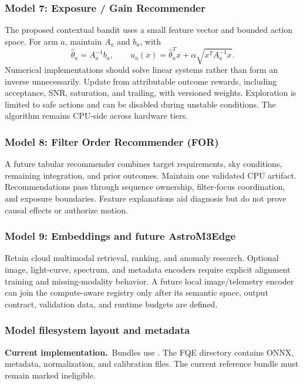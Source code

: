 \documentclass[11pt,a4paper]{article}
\newcommand{\code}[1]{\texttt{\detokenize{#1}}}
\newcommand{\current}{\textbf{Current implementation.}\ }
\begin{document}
\subsubsection{Model 7: Exposure / Gain Recommender}
The proposed contextual bandit uses a small feature vector and bounded action
space. For arm $a$, maintain $A_a$ and $b_a$, with
\[
\hat\theta_a=A_a^{-1}b_a,\qquad
u_a(x)=\hat\theta_a^Tx+\alpha\sqrt{x^TA_a^{-1}x}.
\]
Numerical implementations should solve linear systems rather than form an
inverse unnecessarily. Update from attributable outcome rewards, including
acceptance, SNR, saturation, and trailing, with versioned weights. Exploration
is limited to safe actions and can be disabled during unstable conditions.
The algorithm remains CPU-side across hardware tiers.

\subsubsection{Model 8: Filter Order Recommender (FOR)}
A future tabular recommender combines target requirements, sky conditions,
remaining integration, and prior outcomes. Maintain one validated CPU artifact.
Recommendations pass through sequence ownership, filter-focus coordination,
and exposure boundaries. Feature explanations aid diagnosis but do not prove
causal effects or authorize motion.

\subsubsection{Model 9: Embeddings and future AstroM3Edge}
Retain cloud multimodal retrieval, ranking, and anomaly research. Optional image,
light-curve, spectrum, and metadata encoders require explicit alignment training
and missing-modality behavior. A future local image/telemetry encoder can join
the compute-aware registry only after its semantic space, output contract,
validation data, and runtime budgets are defined.

\subsubsection{Model filesystem layout and metadata}
\current Bundles use \code{models/<model_name>/<version>/}. The FQE directory
contains ONNX, metadata, normalization, and calibration files. The current
reference bundle must remain marked ineligible.
\end{document}
